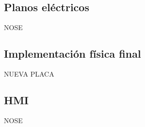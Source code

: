 \subsection{Planos eléctricos}
NOSE

\subsection{Implementación física final}
NUEVA PLACA

\subsection{HMI}
NOSE